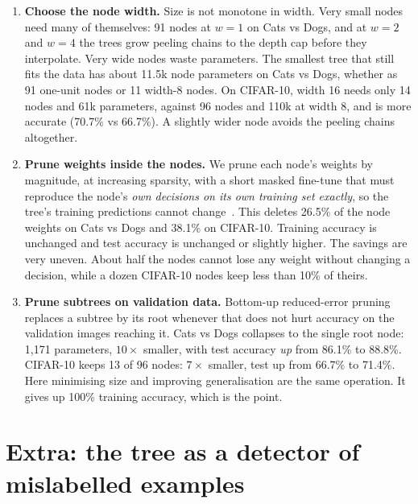 \documentclass[10.5pt,a4paper]{article}
\begin{document}
\begin{enumerate}[(1)]
\item \textbf{Choose the node width.} Size is not monotone in width. Very small nodes need many of themselves: 91
nodes at $w=1$ on Cats vs Dogs, and at $w=2$ and $w=4$ the trees grow peeling chains to the depth cap before they
interpolate. Very wide nodes waste parameters. The smallest tree that still fits the data has about 11.5k node
parameters on Cats vs Dogs, whether as 91 one-unit nodes or 11 width-8 nodes. On CIFAR-10, width 16 needs only 14 nodes
and 61k parameters, against 96 nodes and 110k at width 8, and is more accurate (70.7\% vs 66.7\%). A slightly wider
node avoids the peeling chains altogether.
\item \textbf{Prune weights inside the nodes.} We prune each node's weights by magnitude, at increasing sparsity, with
a short masked fine-tune that must reproduce the node's \emph{own decisions on its own training set exactly}, so the
tree's training predictions cannot change~\cite{han2015learning,frankle2019lottery}. This deletes 26.5\% of the node
weights on Cats vs Dogs and 38.1\% on CIFAR-10. Training accuracy is unchanged and test accuracy is unchanged or
slightly higher. The savings are very uneven. About half the nodes cannot lose any weight without changing a
decision, while a dozen CIFAR-10 nodes keep less than 10\% of theirs.
\item \textbf{Prune subtrees on validation data.} Bottom-up reduced-error pruning~\cite{quinlan1987simplifying}
replaces a subtree by its root whenever that does not hurt accuracy on the validation images reaching it. Cats vs
Dogs collapses to the single root node: 1{,}171 parameters, $10\times$ smaller, with test accuracy \emph{up} from 86.1\% to
88.8\%. CIFAR-10 keeps 13 of 96 nodes: $7\times$ smaller, test up from 66.7\% to 71.4\%. Here minimising size and
improving generalisation are the same operation. It gives up 100\% training accuracy, which is the point.
\end{enumerate}

\section{Extra: the tree as a detector of mislabelled examples}
\label{sec:noise}
\end{document}
